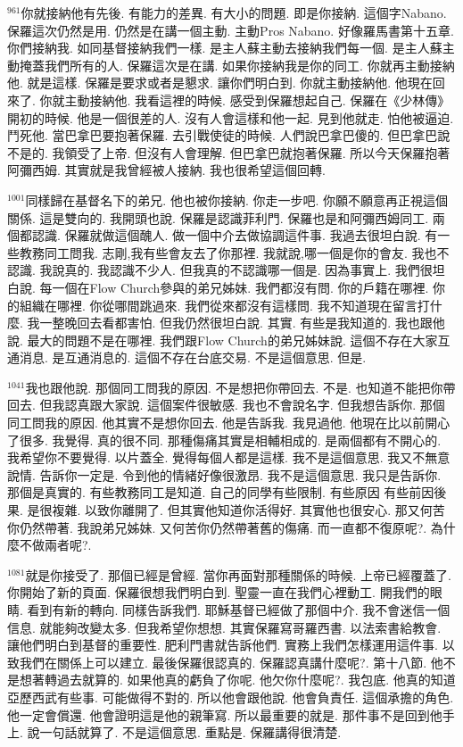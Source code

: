 \documentclass{book}
\begin{document}
$^{961}$你就接納他有先後.
有能力的差異.
有大小的問題.
即是你接納.
這個字Nabano.
保羅這次仍然是用.
仍然是在講一個主動.
主動Pros Nabano.
好像羅馬書第十五章.
你們接納我.
如同基督接納我們一樣.
是主人蘇主動去接納我們每一個.
是主人蘇主動掩蓋我們所有的人.
保羅這次是在講.
如果你接納我是你的同工.
你就再主動接納他.
就是這樣.
保羅是要求或者是懇求.
讓你們明白到.
你就主動接納他.
他現在回來了.
你就主動接納他.
我看這裡的時候.
感受到保羅想起自己.
保羅在《少林傳》開初的時候.
他是一個很差的人.
沒有人會這樣和他一起.
見到他就走.
怕他被逼迫.
鬥死他.
當巴拿巴要抱著保羅.
去引戰使徒的時候.
人們說巴拿巴傻的.
但巴拿巴說不是的.
我領受了上帝.
但沒有人會理解.
但巴拿巴就抱著保羅.
所以今天保羅抱著阿彌西姆.
其實就是我曾經被人接納.
我也很希望這個回轉.

$^{1001}$同樣歸在基督名下的弟兄.
他也被你接納.
你走一步吧.
你願不願意再正視這個關係.
這是雙向的.
我開頭也說.
保羅是認識菲利門.
保羅也是和阿彌西姆同工.
兩個都認識.
保羅就做這個醜人.
做一個中介去做協調這件事.
我過去很坦白說.
有一些教務同工問我.
志剛,我有些會友去了你那裡.
我就說,哪一個是你的會友.
我也不認識.
我說真的.
我認識不少人.
但我真的不認識哪一個是.
因為事實上.
我們很坦白說.
每一個在Flow Church參與的弟兄姊妹.
我們都沒有問.
你的戶籍在哪裡.
你的組織在哪裡.
你從哪間跳過來.
我們從來都沒有這樣問.
我不知道現在留言打什麼.
我一整晚回去看都害怕.
但我仍然很坦白說.
其實.
有些是我知道的.
我也跟他說.
最大的問題不是在哪裡.
我們跟Flow Church的弟兄姊妹說.
這個不存在大家互通消息.
是互通消息的.
這個不存在台底交易.
不是這個意思.
但是.

$^{1041}$我也跟他說.
那個同工問我的原因.
不是想把你帶回去.
不是.
也知道不能把你帶回去.
但我認真跟大家說.
這個案件很敏感.
我也不會說名字.
但我想告訴你.
那個同工問我的原因.
他其實不是想你回去.
他是告訴我.
我見過他.
他現在比以前開心了很多.
我覺得.
真的很不同.
那種傷痛其實是相輔相成的.
是兩個都有不開心的.
我希望你不要覺得.
以片蓋全.
覺得每個人都是這樣.
我不是這個意思.
我又不無意說情.
告訴你一定是.
令到他的情緒好像很激昂.
我不是這個意思.
我只是告訴你.
那個是真實的.
有些教務同工是知道.
自己的同學有些限制.
有些原因 有些前因後果.
是很複雜.
以致你離開了.
但其實他知道你活得好.
其實他也很安心.
那又何苦你仍然帶著.
我說弟兄姊妹.
又何苦你仍然帶著舊的傷痛.
而一直都不復原呢?.
為什麼不做兩者呢?.

$^{1081}$就是你接受了.
那個已經是曾經.
當你再面對那種關係的時候.
上帝已經覆蓋了.
你開始了新的頁面.
保羅很想我們明白到.
聖靈一直在我們心裡動工.
開我們的眼睛.
看到有新的轉向.
同樣告訴我們.
耶穌基督已經做了那個中介.
我不會迷信一個信息.
就能夠改變太多.
但我希望你想想.
其實保羅寫哥羅西書.
以法索書給教會.
讓他們明白到基督的重要性.
肥利門書就告訴他們.
實務上我們怎樣運用這件事.
以致我們在關係上可以建立.
最後保羅很認真的.
保羅認真講什麼呢?.
第十八節.
他不是想著轉過去就算的.
如果他真的虧負了你呢.
他欠你什麼呢?.
我包底.
他真的知道亞歷西武有些事.
可能做得不對的.
所以他會跟他說.
他會負責任.
這個承擔的角色.
他一定會償還.
他會證明這是他的親筆寫.
所以最重要的就是.
那件事不是回到他手上.
說一句話就算了.
不是這個意思.
重點是.
保羅講得很清楚.
\end{document}
